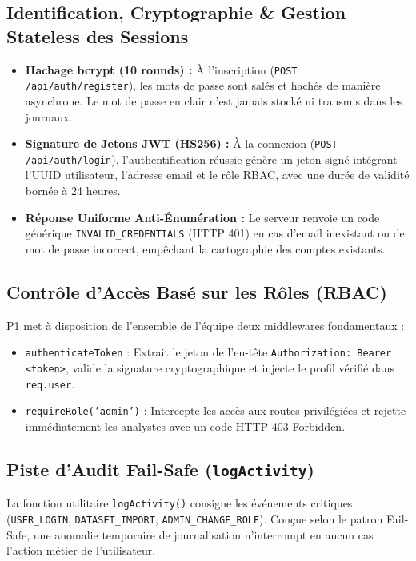 \documentclass[11pt,a4paper]{article}
\begin{document}
\subsection{Identification, Cryptographie \& Gestion Stateless des Sessions}
\begin{itemize}[leftmargin=1.5cm, label=\textcolor{techblue}{\textbullet}]
    \item \textbf{Hachage bcrypt (10 rounds) :} À l'inscription (\texttt{POST /api/auth/register}), les mots de passe sont salés et hachés de manière asynchrone. Le mot de passe en clair n'est jamais stocké ni transmis dans les journaux.
    \item \textbf{Signature de Jetons JWT (HS256) :} À la connexion (\texttt{POST /api/auth/login}), l'authentification réussie génère un jeton signé intégrant l'UUID utilisateur, l'adresse email et le rôle RBAC, avec une durée de validité bornée à 24 heures.
    \item \textbf{Réponse Uniforme Anti-Énumération :} Le serveur renvoie un code générique \texttt{INVALID\_CREDENTIALS} (HTTP 401) en cas d'email inexistant ou de mot de passe incorrect, empêchant la cartographie des comptes existants.
\end{itemize}

\subsection{Contrôle d'Accès Basé sur les Rôles (RBAC)}
P1 met à disposition de l'ensemble de l'équipe deux middlewares fondamentaux :
\begin{itemize}[leftmargin=1.5cm, label=\textcolor{techblue}{\textbullet}]
    \item \texttt{authenticateToken} : Extrait le jeton de l'en-tête \texttt{Authorization: Bearer <token>}, valide la signature cryptographique et injecte le profil vérifié dans \texttt{req.user}.
    \item \texttt{requireRole('admin')} : Intercepte les accès aux routes privilégiées et rejette immédiatement les analystes avec un code HTTP 403 Forbidden.
\end{itemize}

\subsection{Piste d'Audit Fail-Safe (\texttt{logActivity})}
La fonction utilitaire \texttt{logActivity()} consigne les événements critiques (\texttt{USER\_LOGIN}, \texttt{DATASET\_IMPORT}, \texttt{ADMIN\_CHANGE\_ROLE}). Conçue selon le patron Fail-Safe, une anomalie temporaire de journalisation n'interrompt en aucun cas l'action métier de l'utilisateur.
\end{document}
